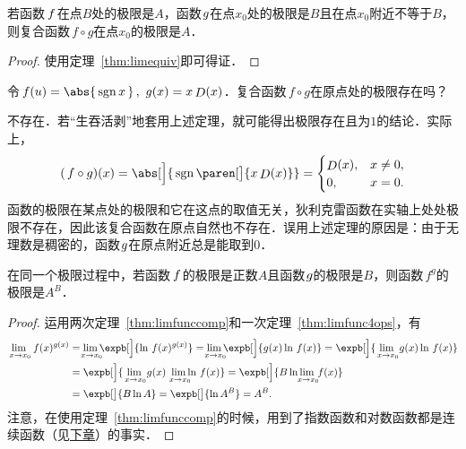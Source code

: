 \begin{theorem}[复合函数的极限]
  \label{thm:limfunccomp}
  若函数\(\,f\mkern2mu\)在点\(B\)处的极限是\(A\)，函数\(\mkern1mu g\)在点\(x_0\)处的极限是\(B\)且在点\(x_0\)附近不等于\(B\)，则复合函数\(\,f \circ g\)在点\(x_0\)的极限是\(A\)．

  \begin{proof}
    使用定理~\ref{thm:limequiv}即可得证．
  \end{proof}
\end{theorem}

\begin{example*}
  令\(\,f(u) = \abs{\,\sgn x\,}\,,\ g(x) = x \Fn D(x)\)．复合函数\(\,f \circ g\)在原点处的极限存在吗？

  \begin{remark}
    不存在．若“生吞活剥”地套用上述定理，就可能得出极限存在且为\(1\)的结论．实际上，
    \begin{equation*}
      (\,f \circ g)(x)
      = \abs[\Big]{\,\sgn\paren[\big]{x \Fn D(x)}} =
      \begin{cases}
        \Fn D(x), & x \ne 0, \\
        0, & x = 0.
      \end{cases}
    \end{equation*}
    函数的极限在某点处的极限和它在这点的取值无关，狄利克雷函数在实轴上处处极限不存在，因此该复合函数在原点自然也不存在．误用上述定理的原因是：由于无理数是稠密的，函数\(\mkern1mu g\)在原点附近总是能取到\(0\)．
  \end{remark}
\end{example*}

\begin{theorem}
  \label{thm:limfuncpowexp}
  在同一个极限过程中，若函数\(\,f\mkern2mu\)的极限是正数\(A\)且函数\(\mkern1mu g\)的极限是\(B\)，则函数\(\,f^g\!\)的极限是\(A^B\)．

  \begin{proof}
    运用两次定理~\ref{thm:limfunccomp}和一次定理~\ref{thm:limfunc4ops}，有
    \begin{align*}
      \lim_{\,x \to x_0\!} \,f(x)^{g(x)}
      &= \smashoperator{\lim_{\,x \to x_0\!}} \expb[\Big]{\ln \,f(x)^{g(x)}}
        = \smashoperator{\lim_{\,x \to x_0\!}} \expb[\Big]{g(x) \ln \,f(x)}
        = \expb[\Big]{\lim_{\,x \to x_0\!} g(x) \ln \,f(x)} \\
      &= \expb[\Big]{\lim_{\,x \to x_0\!} g(x) \smashoperator[r]{\lim_{\,x \to x_0\!}} \ln \,f(x)}
        = \expb[\Big]{B \ln \smashoperator{\lim_{\,x \to x_0\!}} \,f(x)} \\
      &= \expb[\big]{B \ln A} = \expb[\big]{\ln A^B} = A^B.
    \end{align*}
    注意，在使用定理~\ref{thm:limfunccomp}的时候，用到了指数函数和对数函数都是连续函数（见\hyperref[ch:cont]{下章}）的事实．
  \end{proof}
\end{theorem}

